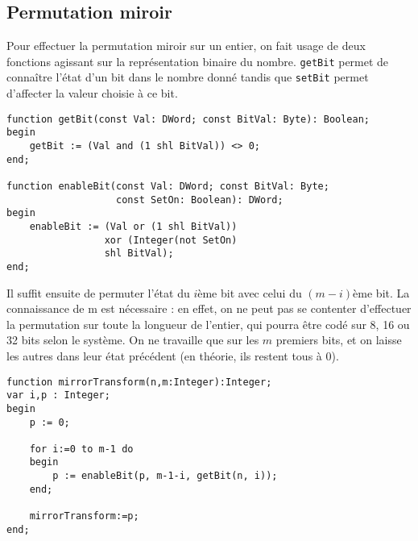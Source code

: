 \documentclass{report}
\begin{document}
	\subsection{Permutation miroir}
	Pour effectuer la permutation miroir sur un entier, on fait usage de deux fonctions agissant sur la représentation binaire du nombre. \texttt{getBit} permet de connaître l'état d'un bit dans le nombre donné tandis que \texttt{setBit} permet d'affecter la valeur choisie à ce bit.
	\begin{lstlisting}
function getBit(const Val: DWord; const BitVal: Byte): Boolean;
begin
	getBit := (Val and (1 shl BitVal)) <> 0;
end;

function enableBit(const Val: DWord; const BitVal: Byte; 
				   const SetOn: Boolean): DWord;
begin
	enableBit := (Val or (1 shl BitVal)) 
				 xor (Integer(not SetOn) 
				 shl BitVal);
end;
	\end{lstlisting}
	Il suffit ensuite de permuter l'état du $i$ème bit avec celui du $(m-i)$ème bit. La connaissance de m est nécessaire : en effet, on ne peut pas se contenter d'effectuer la permutation sur toute la longueur de l'entier, qui pourra être codé sur 8, 16 ou 32 bits selon le système. On ne travaille que sur les $m$ premiers bits, et on laisse les autres dans leur état précédent (en théorie, ils restent tous à 0).
	\begin{lstlisting}
function mirrorTransform(n,m:Integer):Integer;
var i,p : Integer;
begin
	p := 0;

	for i:=0 to m-1 do
	begin
		p := enableBit(p, m-1-i, getBit(n, i));
	end;

	mirrorTransform:=p;
end;
	\end{lstlisting}
\end{document}

